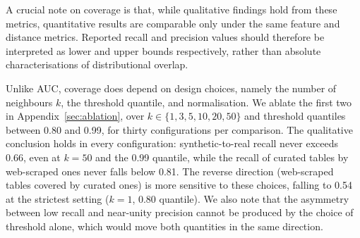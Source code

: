 \documentclass{article}
\begin{document}
A crucial note on coverage is that, while qualitative findings hold from these metrics, quantitative results are comparable only under the same feature and distance metrics.
Reported recall and precision values should therefore be interpreted as lower and upper bounds respectively, rather than absolute characterisations of distributional overlap.

Unlike AUC, coverage does depend on design choices, namely the number of neighbours $k$, the threshold quantile, and normalisation.
We ablate the first two in Appendix~\ref{sec:ablation}, over $k \in \{1, 3, 5, 10, 20, 50\}$ and threshold quantiles between 0.80 and 0.99, for thirty configurations per comparison.
The qualitative conclusion holds in every configuration: synthetic-to-real recall never exceeds 0.66, even at $k = 50$ and the 0.99 quantile, while the recall of curated tables by web-scraped ones never falls below 0.81. The reverse direction (web-scraped tables covered by curated ones) is more sensitive to these choices, falling to 0.54 at the strictest setting ($k = 1$, 0.80 quantile).
We also note that the asymmetry between low recall and near-unity precision cannot be produced by the choice of threshold alone, which would move both quantities in the same direction.





\end{document}

